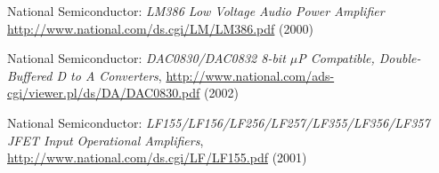 \documentclass[10pt,twoside,openright]{report}
\begin{document}
\pagebreak
\begin{thebibliography}{99}

National Semiconductor:
\emph{LM386 Low Voltage Audio Power Amplifier}
\url{http://www.national.com/ds.cgi/LM/LM386.pdf} (2000)

National Semiconductor:
\emph{DAC0830/DAC0832 8-bit $\mu$P Compatible, Double-Buffered D to A Converters}, 
\url{http://www.national.com/ads-cgi/viewer.pl/ds/DA/DAC0830.pdf} (2002)

National Semiconductor:
\emph{LF155/LF156/LF256/LF257/LF355/LF356/LF357 JFET Input Operational Amplifiers},
\url{http://www.national.com/ds.cgi/LF/LF155.pdf} (2001)

\end{thebibliography}

\fi %
\end{document}
